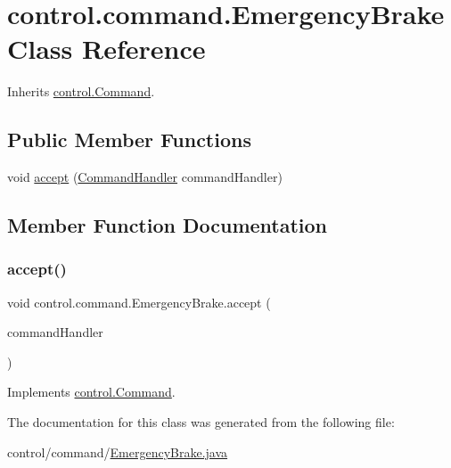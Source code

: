 \hypertarget{classcontrol_1_1command_1_1_emergency_brake}{}\section{control.\+command.\+Emergency\+Brake Class Reference}
\label{classcontrol_1_1command_1_1_emergency_brake}


Inherits \mbox{\hyperlink{interfacecontrol_1_1_command}{control.\+Command}}.

\subsection*{Public Member Functions}
\begin{DoxyCompactItemize}
\item 
void \mbox{\hyperlink{classcontrol_1_1command_1_1_emergency_brake_adabaf905354a3c45d60c76dd94efd1e3}{accept}} (\mbox{\hyperlink{interfacecontrol_1_1_command_handler}{Command\+Handler}} command\+Handler)
\end{DoxyCompactItemize}


\subsection{Member Function Documentation}
\mbox{\label{classcontrol_1_1command_1_1_emergency_brake_adabaf905354a3c45d60c76dd94efd1e3}} 
\subsubsection{\texorpdfstring{accept()}{accept()}}
{\footnotesize\ttfamily void control.\+command.\+Emergency\+Brake.\+accept (\begin{DoxyParamCaption}\item[{\mbox{\hyperlink{interfacecontrol_1_1_command_handler}{Command\+Handler}}}]{command\+Handler }\end{DoxyParamCaption})}



Implements \mbox{\hyperlink{interfacecontrol_1_1_command_ab81fb31e9d98dfbfbfb7026a5bc823a6}{control.\+Command}}.



The documentation for this class was generated from the following file\+:\begin{DoxyCompactItemize}
\item 
control/command/\mbox{\hyperlink{_emergency_brake_8java}{Emergency\+Brake.\+java}}\end{DoxyCompactItemize}
